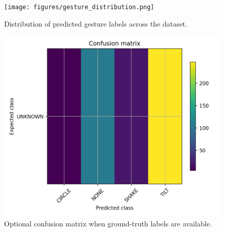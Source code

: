 \documentclass[conference]{IEEEtran}
\begin{document}
\begin{figure}[!t]
    \centering
    \texttt{[image: figures/gesture\_distribution.png]}
    \caption{Distribution of predicted gesture labels across the dataset.}
    \label{fig:gestures}
\end{figure}

\begin{figure}[!t]
    \centering
    \includegraphics[width=0.9\columnwidth]{figures/confusion_matrix.png}
    \caption{Optional confusion matrix when ground-truth labels are available.}
    \label{fig:confusion}
\end{figure}
\end{document}
